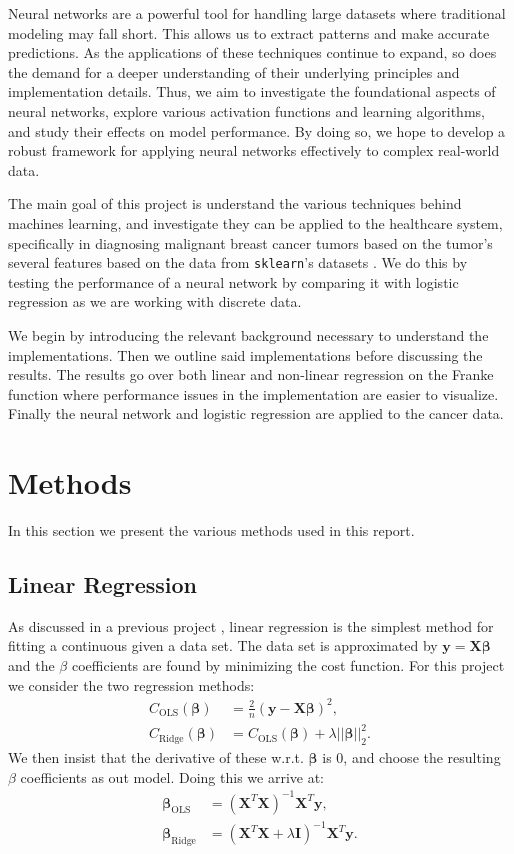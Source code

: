 \documentclass[%
reprint,
amsmath,amssymb,
aps,
]{revtex4-2}
\begin{document}
Neural networks are a powerful tool for handling large datasets where traditional modeling may fall short. This allows us to extract patterns and make accurate predictions. As the applications of these techniques continue to expand, so does the demand for a deeper understanding of their underlying principles and implementation details. Thus, we aim to investigate the foundational aspects of neural networks, explore various activation functions and learning algorithms, and study their effects on model performance. By doing so, we hope to develop a robust framework for applying neural networks effectively to complex real-world data.

The main goal of this project is understand the various techniques behind machines learning, and investigate they can be applied to the healthcare system, specifically in diagnosing malignant breast cancer tumors based on the tumor's several features based on the data from \texttt{sklearn}'s datasets \cite{sklearn}. We do this by testing the performance of a neural network by comparing it with logistic regression as we are working with discrete data. 

We begin by introducing the relevant background necessary to understand the implementations. Then we outline said implementations before discussing the results. The results go over both linear and non-linear regression on the Franke function where performance issues in the implementation are easier to visualize. Finally the neural network and logistic regression are applied to the cancer data. 

\section{Methods}
In this section we present the various methods used in this report. 

\subsection{Linear Regression}
As discussed in a previous project \cite{project1}, linear regression is the simplest method for fitting a continuous given a data set. The data set is approximated by $\bm y=\bm X\bm\beta$ and the $\beta$ coefficients are found by minimizing the cost function. For this project we consider the two regression methods:
\begin{align}
	C_\text{OLS}(\bm\beta)&=\frac{2}{n}(\bm y-\bm X\bm\beta)^2,\\
	C_\text{Ridge}(\bm\beta)&=C_\text{OLS}(\bm\beta)+\lambda||\bm\beta||_2^2.
\end{align}
We then insist that the derivative of these w.r.t. $\bm\beta$ is $0$, and choose the resulting $\beta$ coefficients as out model. Doing this we arrive at:
\begin{align}
	\bm\beta_\text{OLS}&=(\bm X^T\bm X)^{-1}\bm X^T\bm y,\\
	\bm\beta_\text{Ridge}&=(\bm X^T\bm X+\lambda \bm I)^{-1}\bm X^T\bm y.
\end{align}
\end{document}
